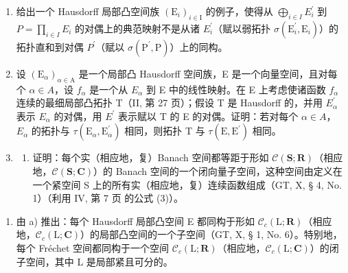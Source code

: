 \begin{enumerate}
\def\labelenumi{\arabic{enumi})}
\setcounter{enumi}{22}
\item
  给出一个 Hausdorff 局部凸空间族 \((\mathrm{E}_{i})_{i\in\mathrm{I}}\) 的例子，使得从 \(\bigoplus_{i\in I} E_{i}^{\prime}\) 到 \(P = \prod_{i\in I} E_{i}\) 的对偶上的典范映射不是从诸 \(E_{i}^{\prime}\)（赋以弱拓扑 \(\sigma(\mathrm{E}_{i}^{\prime}, \mathrm{E}_{i})\)）的拓扑直和到对偶 \(P^{\prime}\)（赋以 \(\sigma(\mathrm{P}^{\prime}, \mathrm{P})\)）上的同构。
\item
  设 \((\mathrm{E}_{\alpha})_{\alpha\in\mathrm{A}}\) 是一个局部凸 Hausdorff 空间族，E 是一个向量空间，且对每个 \(\alpha\in A\)，设 \(f_{\alpha}\) 是一个从 \(E_{\alpha}\) 到 E 中的线性映射。在 E 上考虑使诸函数 \(f_{\alpha}\) 连续的最细局部凸拓扑 T（II, 第 27 页）；假设 T 是 Hausdorff 的，并用 \(E_{\alpha}^{\prime}\) 表示 \(E_{\alpha}\) 的对偶，用 \(E^{\prime}\) 表示赋以 T 的 E 的对偶。证明：若对每个 \(\alpha\in A\)，\(E_{\alpha}\) 的拓扑与 \(\tau(\mathrm{E}_{\alpha},\mathrm{E}_{\alpha}^{\prime})\) 相同，则拓扑 T 与 \(\tau(\mathrm{E},\mathrm{E}^{\prime})\) 相同。
\item
  \begin{enumerate}
  \def\labelenumii{\alph{enumii})}
  \tightlist
  \item
    证明：每个实（相应地，复）Banach 空间都等距于形如 \(\mathcal{C}(\mathbf{S};\mathbf{R})\)（相应地，\(\mathcal{C}(\mathbf{S};\mathbf{C})\)）的 Banach 空间的一个闭向量子空间，这种空间由定义在一个紧空间 S 上的所有实（相应地，复）连续函数组成（GT, X, § 4, No. 1）（利用 IV, 第 7 页 的公式 (3)）。
  \end{enumerate}
\end{enumerate}

\begin{enumerate}
\def\labelenumi{\alph{enumi})}
\setcounter{enumi}{1}
\tightlist
\item
  由 a) 推出：每个 Hausdorff 局部凸空间 E 都同构于形如 \(\mathcal{C}_{c}(\mathrm{L};\mathbf{R})\)（相应地，\(\mathcal{C}_{c}(\mathrm{L};\mathbf{C})\)）的局部凸空间的一个子空间（GT, X, § 1, No. 6）。特别地，每个 Fréchet 空间都同构于一个空间 \(\mathcal{C}_{c}(\mathrm{L};\mathbf{R})\)（相应地，\(\mathcal{C}_{c}(\mathrm{L};\mathbf{C})\)）的闭子空间，其中 L 是局部紧且可分的。
\end{enumerate}
